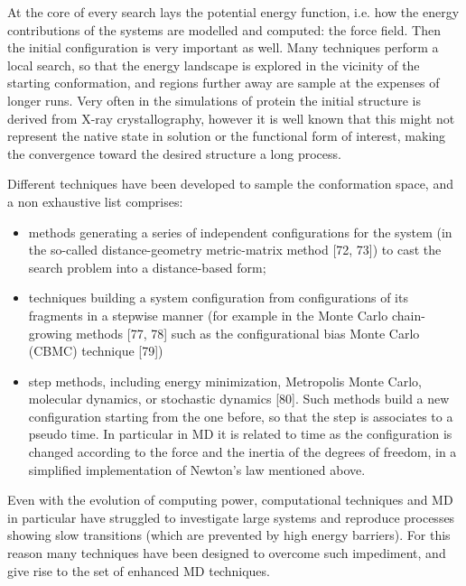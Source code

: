 At the core of every search lays the potential energy function, i.e. how the energy contributions of the systems are modelled and computed: the force field. Then the initial configuration is very important as well.
%
Many techniques perform a local search, so that the energy landscape is explored in the vicinity of the starting conformation, and regions further away are sample at the expenses of longer runs. Very often in the simulations of protein the initial structure is derived from X-ray crystallography, however it is well known that this might not represent the native state in solution or the functional form of interest, making the convergence toward the desired structure a long process.

Different techniques have been developed to sample the conformation space, and a non exhaustive list comprises:
\begin{itemize}
\item methods generating a series of independent configurations for the system (in the so-called distance-geometry metric-matrix method [72, 73]) to cast the search problem into a distance-based form;
\item techniques building a system configuration from configurations of its fragments in a stepwise manner (for example in the Monte Carlo chain-growing methods [77, 78] such as the configurational bias Monte Carlo (CBMC) technique [79])
\item step methods, including energy minimization, Metropolis Monte Carlo, molecular dynamics, or stochastic dynamics [80]. Such methods build a new configuration starting from the one before, so that the step is associates to a pseudo time. In particular in MD it is related to time as the configuration is changed according to the force and the inertia of the degrees of freedom, in a simplified implementation of Newton's law mentioned above.
\end{itemize} 

Even with the evolution of computing power, computational techniques and MD in particular have struggled to investigate large systems and reproduce processes showing slow transitions (which are prevented by high energy barriers). For this reason many techniques have been designed to overcome such impediment, and give rise to the set of enhanced MD techniques.

